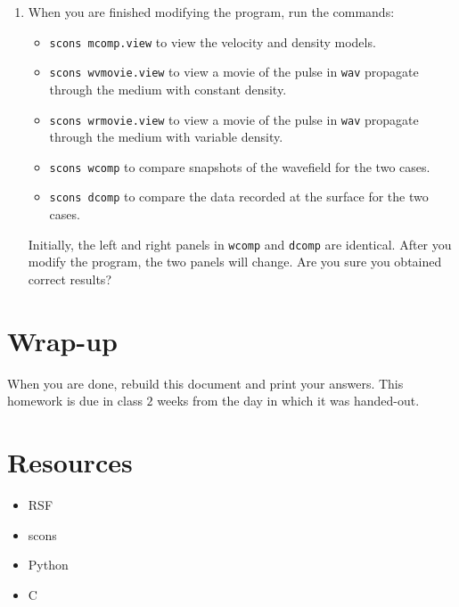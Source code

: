 \begin{enumerate}
\item
When you are finished modifying the program, run the commands:

\begin{itemize}

\item \texttt{scons mcomp.view} to view the velocity and density models.

\item \texttt{scons wvmovie.view} to view a movie of the pulse in
\texttt{wav} propagate through the medium with constant density.

\item \texttt{scons wrmovie.view} to view a movie of the pulse in
\texttt{wav} propagate through the medium with variable density.

\item \texttt{scons wcomp} to compare snapshots of the wavefield
for the two cases.

\item \texttt{scons dcomp} to compare the data recorded at the surface
for the two cases.

\end{itemize}

Initially, the left and right panels in \texttt{wcomp} and 
\texttt{dcomp} are identical. After you modify the program, the 
two panels will change. Are you sure you obtained correct results?

\end{enumerate}


\section{Wrap-up}

When you are done, rebuild this document and 
print your answers. This homework is due in class $2$ weeks
from the day in which it was handed-out.


\section{Resources}

\begin{itemize}
\item RSF
\item scons
\item Python
\item C
\end{itemize}
